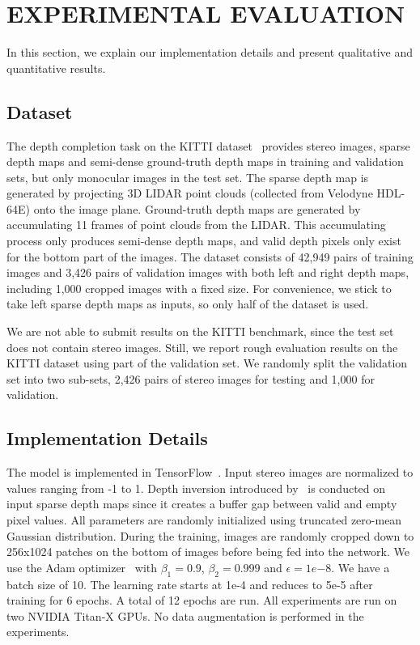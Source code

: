 \documentclass[letterpaper, 10 pt, conference]{ieeeconf}
\begin{document}
\section{EXPERIMENTAL EVALUATION}
In this section, we explain our implementation details and present qualitative and quantitative results.

\subsection{Dataset}
    The depth completion task on the KITTI dataset~\cite{sparsityCNN} provides stereo images, sparse depth maps and semi-dense ground-truth depth maps in training and validation sets, but only monocular images in the test set. The sparse depth map is generated by projecting 3D LIDAR point clouds (collected from Velodyne HDL-64E) onto the image plane. Ground-truth depth maps are generated by accumulating 11 frames of point clouds from the LIDAR. This accumulating process only produces semi-dense depth maps, and valid depth pixels only exist for the bottom part of the images. The dataset consists of 42,949 pairs of training images and 3,426 pairs of validation images with both left and right depth maps, including 1,000 cropped images with a fixed size. For convenience, we stick to take left sparse depth maps as inputs, so only half of the dataset is used.
    
    We are not able to submit results on the KITTI benchmark, since the test set does not contain stereo images. Still, we report rough evaluation results on the KITTI dataset using part of the validation set. We randomly split the validation set into two sub-sets, 2,426 pairs of stereo images for testing and 1,000 for validation.

\subsection{Implementation Details}
    The model is implemented in TensorFlow~\cite{tensorflow}. Input stereo images are normalized to values ranging from -1 to 1. Depth inversion introduced by~\cite{ku2018defense} is conducted on input sparse depth maps since it creates a buffer gap between valid and empty pixel values. All parameters are randomly initialized using truncated zero-mean Gaussian distribution. During the training, images are randomly cropped down to 256x1024 patches on the bottom of images before being fed into the network. We use the Adam optimizer~\cite{adam} with $\beta_1=0.9$, $\beta_2=0.999$ and $\epsilon=1e{-8}$. We have a batch size of 10. The learning rate starts at 1e-4 and reduces to 5e-5 after training for 6 epochs. A total of 12 epochs are run. All experiments are run on two NVIDIA Titan-X GPUs. No data augmentation is performed in the experiments.  
\end{document}
